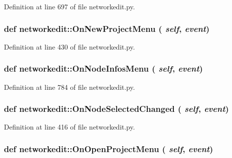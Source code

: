 Definition at line 697 of file networkedit.py.\hypertarget{namespacenetworkedit_900ce0c234a0cb0b051e23780999e052}{
\subsubsection[OnNewProjectMenu]{\setlength{\rightskip}{0pt plus 5cm}def networkedit::On\-New\-Project\-Menu ( {\em self},  {\em event})}}
\label{namespacenetworkedit_900ce0c234a0cb0b051e23780999e052}




Definition at line 430 of file networkedit.py.\hypertarget{namespacenetworkedit_45c1bba6fe5ef90e41730de7039a937b}{
\subsubsection[OnNodeInfosMenu]{\setlength{\rightskip}{0pt plus 5cm}def networkedit::On\-Node\-Infos\-Menu ( {\em self},  {\em event})}}
\label{namespacenetworkedit_45c1bba6fe5ef90e41730de7039a937b}




Definition at line 784 of file networkedit.py.\hypertarget{namespacenetworkedit_5998cd277c097979131afcdda5f39464}{
\subsubsection[OnNodeSelectedChanged]{\setlength{\rightskip}{0pt plus 5cm}def networkedit::On\-Node\-Selected\-Changed ( {\em self},  {\em event})}}
\label{namespacenetworkedit_5998cd277c097979131afcdda5f39464}




Definition at line 416 of file networkedit.py.\hypertarget{namespacenetworkedit_7ffb18f26bd0a019c59e9402373b904e}{
\subsubsection[OnOpenProjectMenu]{\setlength{\rightskip}{0pt plus 5cm}def networkedit::On\-Open\-Project\-Menu ( {\em self},  {\em event})}}
\label{namespacenetworkedit_7ffb18f26bd0a019c59e9402373b904e}




